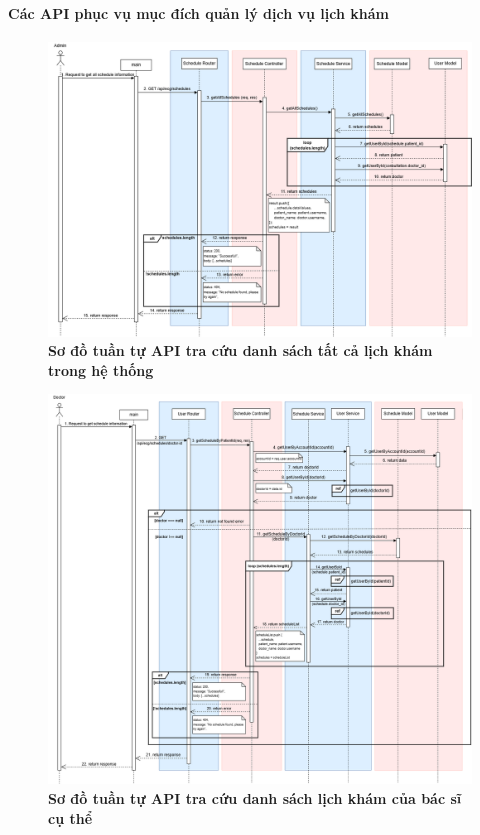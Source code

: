 \paragraph{Các API phục vụ mục đích quản lý dịch vụ lịch khám}
\mbox{}
\begin{figure}[H]
	\centering
	\includegraphics[width=16cm]{Images/api_sequence/schedule/getAllSchedules.drawio.png}
	\caption[Sơ đồ tuần tự API tra cứu danh sách tất cả lịch khám trong hệ thống]{\bfseries \fontsize{12pt}{0pt}\selectfont Sơ đồ tuần tự API tra cứu danh sách tất cả lịch khám trong hệ thống}
	\label{sequence_diagram_get_schedule}
\end{figure}

\begin{figure}[H]
	\centering
	\includegraphics[width=16cm]{Images/api_sequence/schedule/getScheduleByDoctorId.drawio.png}
	\caption[Sơ đồ tuần tự API tra cứu danh sách lịch khám của bác sĩ cụ thể]{\bfseries \fontsize{12pt}{0pt}\selectfont Sơ đồ tuần tự API tra cứu danh sách lịch khám của bác sĩ cụ thể}
	\label{sequence_diagram_get_schedule_by_doctor}
\end{figure}

